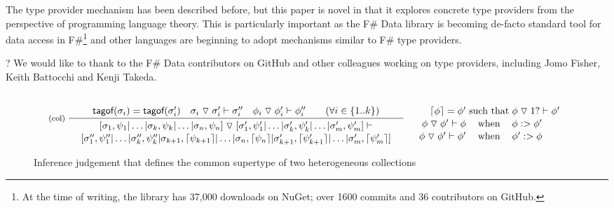 \documentclass[10pt,preprint,blind,clearpagebib]{sigplanconf}
\newcommand{\ident}[1]{\textnormal{\sffamily #1}}
\newcommand{\narrow}[1]{\hspace{-0.7em} #1 \hspace{-0.7em}}
\newcommand{\tsep}[0]{\; \triangledown \;}
\newcommand{\addopt}[1]{\lceil#1\rceil}
\newcommand{\tytagof}{\ident{tagof}}
\begin{document}
The type provider mechanism has been described before, but this paper is novel in that it explores concrete
type providers from the perspective of programming language theory. This is particularly important as the
F\# Data library is becoming de-facto standard tool for data access in F\#\footnote{At the time of writing, 
the library has 37,000 downloads on NuGet; over 1600 commits and 36 contributors on GitHub.} and other 
languages are beginning to adopt mechanisms similar to F\# type providers.

\acks
?
We would like to thank to the F\# Data contributors on GitHub and other colleagues working on type providers,
including Jomo Fisher, Keith Battocchi and Kenji Takeda.




\appendix

\begin{figure}
\noindent
\begin{equation*}
\inference[(col)\;]
  { \tytagof(\sigma_i) = \tytagof(\sigma'_i) \quad 
    \sigma_i \tsep \sigma'_i \vdash \sigma''_i \quad
    \phi_i \tsep \phi'_i \vdash \phi''_i \qquad (\forall i\in \{ 1 .. k \}) }
  { \begin{array}{c}
    [\sigma_1,\psi_1 | \ldots | \sigma_k,\psi_k | \ldots | \sigma_n,\psi_n ] \tsep 
    [\sigma'_1,\psi'_1 | \ldots | \sigma'_k, \psi'_k | \ldots | \sigma'_m, \psi'_m ] \vdash\\[0.1em]
    [\sigma''_1, \psi''_1 | \ldots | \sigma''_k, \psi''_k | 
        \sigma_{k+1},\addopt{\psi_{k+1}} | \ldots | \sigma_{n},\addopt{\psi_{n}} |
        \sigma'_{k+1},\addopt{\psi'_{k+1}} | \ldots | \sigma'_{m}, \addopt{\psi'_{m}} ]
    \end{array} }
\quad
\begin{array}{rcl}
 \\
 \addopt{\phi} = \phi'&\narrow{\textnormal{such that}}&\phi \tsep 1? \vdash \phi' \\[0.1em]
 \phi \tsep \phi' \vdash \phi&\narrow{\textnormal{when}}&\phi :> \phi' \\[0.1em]
 \phi \tsep \phi' \vdash \phi'&\narrow{\textnormal{when}}&\phi' :> \phi
\end{array}    
\end{equation*}
\caption{Inference judgement that defines the common supertype of two heterogeneous collections}
\label{fig:subtyping-hetcol}
\end{figure}
\end{document}
